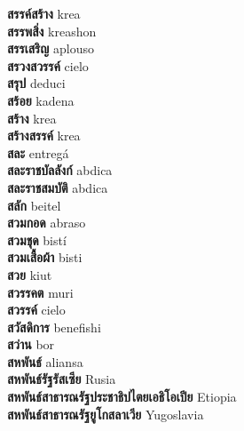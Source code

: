 \textbf{ สรรค์สร้าง  } krea \\
\textbf{ สรรพสิ่ง  } kreashon \\
\textbf{ สรรเสริญ  } aplouso \\
\textbf{ สรวงสวรรค์  } cielo \\
\textbf{ สรุป  } deduci \\
\textbf{ สร้อย  } kadena \\
\textbf{ สร้าง  } krea \\
\textbf{ สร้างสรรค์  } krea \\
\textbf{ สละ  } entregá \\
\textbf{ สละราชบัลลังก์  } abdica \\
\textbf{ สละราชสมบัติ  } abdica \\
\textbf{ สลัก  } beitel \\
\textbf{ สวมกอด  } abraso \\
\textbf{ สวมชุด  } bistí \\
\textbf{ สวมเสื้อผ้า  } bisti \\
\textbf{ สวย  } kiut \\
\textbf{ สวรรคต  } muri \\
\textbf{ สวรรค์  } cielo \\
\textbf{ สวัสดิการ  } benefishi \\
\textbf{ สว่าน  } bor \\
\textbf{ สหพันธ์  } aliansa \\
\textbf{ สหพันธ์รัฐรัสเซีย  } Rusia \\
\textbf{ สหพันธ์สาธารณรัฐประชาธิปไตยเอธิโอเปีย  } Etiopia \\
\textbf{ สหพันธ์สาธารณรัฐยูโกสลาเวีย  } Yugoslavia \\
